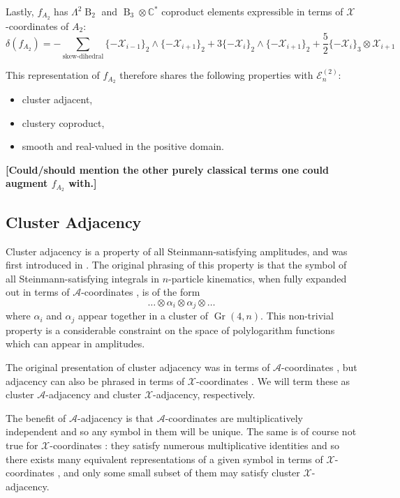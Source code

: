 \documentclass[11pt]{article}
\DeclareMathOperator{\B}{B}
\DeclareMathOperator{\Gr}{Gr}
\def\x{\mathcal{X}}
\def\xcoords{$\mathcal{X}$-coordinates }
\def\a{\mathcal{A}}
\def\acoords{$\mathcal{A}$-coordinates }
\def\draftnote#1{{\bf [#1]}}
\begin{document}
Lastly, $f_{A_2}$ has $\Lambda^2\B_2$ and $\B_3 \otimes \mathbb{C}^*$ coproduct elements expressible in terms of \xcoords of $A_2$:
\begin{equation}
	\delta\left(f_{A_2}\right) = -\sum_{\text{skew-dihedral}} \{-\x_{i-1}\}_2 \wedge \{-\x_{i+1}\}_2 + 3\{-\x_{i}\}_2 \wedge \{-\x_{i+1}\}_2 + \frac{5}{2}\{-\x_{i}\}_3 \otimes \x_{i+1}
\end{equation}

This representation of $f_{A_2}$ therefore shares the following properties with $\mathcal{E}^{(2)}_n$:
\begin{itemize}
	\item cluster adjacent,
	\item clustery coproduct,
	\item smooth and real-valued in the positive domain.
\end{itemize}

\draftnote {Could/should mention the other purely classical terms one could augment $f_{A_2}$ with.}

\subsection{Cluster Adjacency}

Cluster adjacency is a property of all Steinmann-satisfying amplitudes, and was first introduced in \cite{Drummond:2017ssj}. The original phrasing of this property is that the symbol of all Steinmann-satisfying integrals in $n$-particle kinematics, when fully expanded out in terms of \acoords, is of the form 
\begin{equation}
	\ldots \otimes \alpha_i \otimes \alpha_j\otimes \ldots 
\end{equation}
where $\alpha_i$ and $\alpha_j$ appear together in a cluster of $\Gr(4,n)$. This non-trivial property is a considerable constraint on the space of polylogarithm functions which can appear in amplitudes. 

The original presentation of cluster adjacency was in terms of \acoords, but adjacency can also be phrased in terms of \xcoords. We will term these as cluster $\a$-adjacency and cluster $\x$-adjacency, respectively. 

The benefit of $\a$-adjacency is that \acoords are multiplicatively independent and so any symbol in them will be unique. The same is of course not true for \xcoords: they satisfy numerous multiplicative identities and so there exists many equivalent representations of a given symbol in terms of \xcoords, and only some small subset of them may satisfy cluster $\x$- adjacency. 
\end{document}
